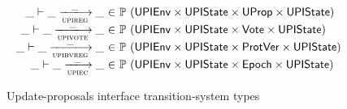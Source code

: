 \begin{figure}[htb]
\begin{equation*}
\begin{array}{r@{~\in~}l}
      \_ \vdash \_ \trans{upireg}{\_} \_ &
      \powerset (\UPIEnv \times \UPIState \times \UProp \times \UPIState)\\
      \_ \vdash \_ \trans{upivote}{\_} \_ &
      \powerset (\UPIEnv \times \UPIState \times \Vote \times \UPIState)\\
      \_ \vdash \_ \trans{upibvreg}{\_} \_ &
      \powerset (\UPIEnv \times \UPIState \times \ProtVer \times \UPIState)\\
      \_ \vdash \_ \trans{upiec}{\_} \_ &
      \powerset (\UPIEnv \times \UPIState \times \Epoch \times \UPIState)
    \end{array}
  \end{equation*}
  \caption{Update-proposals interface transition-system types}
  \label{fig:ts-types:upi}
\end{figure}


